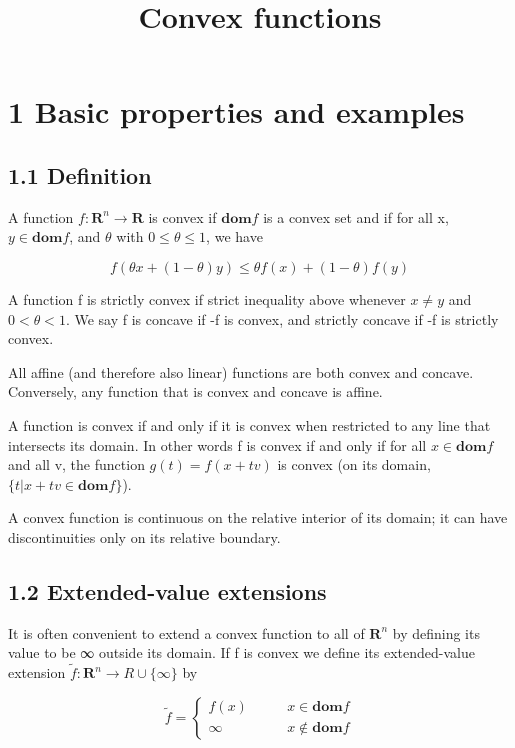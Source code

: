 \documentclass{article}
\title{Convex functions}
\begin{document}
\maketitle

\section*{1 Basic properties and examples}

\subsection*{1.1 Definition}

A function $f: \mathbf{R}^n \rightarrow \mathbf{R}$ is convex if $\mathbf{dom} f$ is a convex set and if for all x,
$y \in \mathbf{dom}f$, and $\theta$ with $0 \le\theta\le1$, we have

\[
f(\theta x+(1-\theta)y)\le\theta f(x)+(1-\theta)f(y)
\]

A function f is strictly convex if strict inequality above whenever $x \ne y$
and $0 < \theta < 1$. We say f is concave if -f is convex, and strictly concave if -f is
strictly convex.

All affine (and therefore
also linear) functions are both convex and concave. Conversely, any function that
is convex and concave is affine.

A function is convex if and only if it is convex when restricted to any line that
intersects its domain. In other words f is convex if and only if for all $x \in \mathbf{dom}f$ and
all v, the function $g(t) = f(x+tv)$ is convex (on its domain, $\{t|x+tv \in \mathbf{dom}f\}$).

A convex function is
continuous on the relative interior of its domain; it can have discontinuities only
on its relative boundary.


\subsection*{1.2 Extended-value extensions}

It is often convenient to extend a convex function to all of $\mathbf{R}^n$ by defining its value
to be ∞ outside its domain. If f is convex we define its extended-value extension
$\widetilde{f} : \mathbf{R}^n \rightarrow R \cup \{\infty\}$ by

\begin{equation*}
        \widetilde{f}=
        \left\{
            \begin{array}{lr}
            f(x)\qquad &x\in \mathbf{dom}f\\
            \infty\qquad &x\notin \mathbf{dom}f
            \end{array}
        \right.
\end{equation*}
\end{document}
